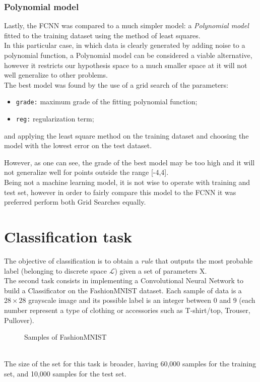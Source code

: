 \documentclass[11pt,a4paper,twocolumn]{IEEEtran}
\begin{document}
				\subsubsection{Polynomial model}
					Lastly, the FCNN was compared to a much simpler model: a \textit{Polynomial model} fitted to the training dataset using the method of least squares.\\
					In this particular case, in which data is clearly generated by adding noise to a polynomial function, a Polynomial model can be considered a viable alternative, however it restricts our hypothesis space to a much smaller space at it will not well generalize to other problems.\medskip\\
					The best model was found by the use of a grid search of the parameters:
					\begin{itemize}
						\item \texttt{grade:} maximum grade of the fitting polynomial function;
						\item \texttt{reg:} regularization term;
					\end{itemize}
					and applying the least square method on the training dataset and choosing the model with the lowest error on the test dataset.\newpage
					\begin{figure}[h]
						\centering
						
					\end{figure}
					However, as one can see, the grade of the best model may be too high and it will not generalize well for points outside the range [-4,4].\medskip\\
					Being not a machine learning model, it is not wise to operate with training and test set, however in order to fairly compare this model to the FCNN it was preferred perform both Grid Searches equally.
	\section{\textbf{Classification task}}
		The objective of classification is to obtain a \textit{rule} that outputs the most probable label (belonging to discrete space $\mathcal{L}$) given a set of parameters X.\medskip\\
		The second task consists in implementing a Convolutional Neural Network to build a Classificator on the FashionMNIST dataset. Each sample of data is a $28\times28$ grayscale image and its possible label is an integer between 0 and 9 (each number represent a type of clothing or accessories such as T-shirt/top, Trouser, Pullover).\vspace*{-.5cm}
		\begin{figure}[h]
			\centering
			
			\caption{Samples of FashionMNIST}
		\end{figure}\\
		The size of the set for this task is broader, having 60,000 samples for the training set, and 10,000 samples for the test set.
\end{document}
